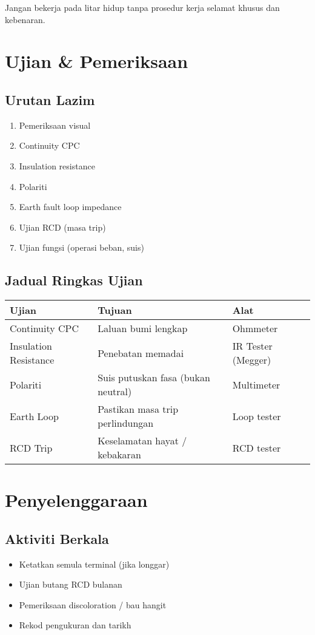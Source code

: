 \documentclass[12pt,a4paper,oneside]{scrreprt}
\newcommand{\amaran}[1]{\begin{tcolorbox}[colframe=WarnRed,title=Amaran,colback=WarnRed!3]#1\end{tcolorbox}}
\begin{document}
\amaran{Jangan bekerja pada litar hidup tanpa prosedur kerja selamat khusus dan kebenaran.}

\chapter{Ujian \& Pemeriksaan}
\section{Urutan Lazim}
\begin{enumerate}
  \item Pemeriksaan visual
  \item Continuity CPC
  \item Insulation resistance
  \item Polariti
  \item Earth fault loop impedance
  \item Ujian RCD (masa trip)
  \item Ujian fungsi (operasi beban, suis)
\end{enumerate}

\section{Jadual Ringkas Ujian}
\begin{longtable}{p{3.2cm}p{5.5cm}p{4.5cm}}
\toprule
Ujian & Tujuan & Alat \\
\midrule
Continuity CPC & Laluan bumi lengkap & Ohmmeter \\
Insulation Resistance & Penebatan memadai & IR Tester (Megger) \\
Polariti & Suis putuskan fasa (bukan neutral) & Multimeter \\
Earth Loop & Pastikan masa trip perlindungan & Loop tester \\
RCD Trip & Keselamatan hayat / kebakaran & RCD tester \\
\bottomrule
\end{longtable}

\chapter{Penyelenggaraan}
\section{Aktiviti Berkala}
\begin{itemize}
  \item Ketatkan semula terminal (jika longgar)
  \item Ujian butang RCD bulanan
  \item Pemeriksaan discoloration / bau hangit
  \item Rekod pengukuran dan tarikh
\end{itemize}
\end{document}

